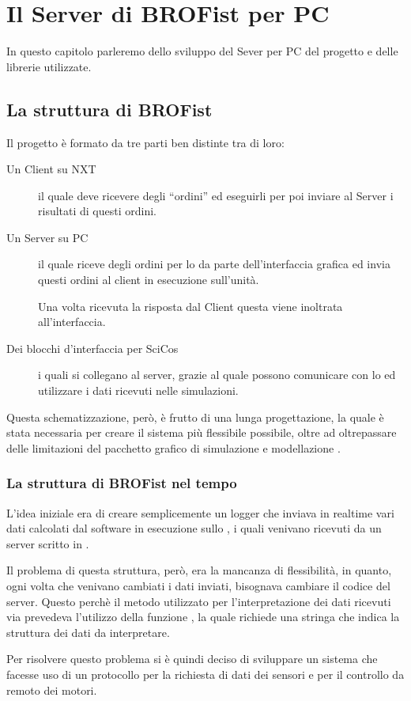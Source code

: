 \chapter{Il Server di BROFist per PC}
\label{chap:PCServ}

In questo capitolo parleremo dello sviluppo del Sever per PC
del progetto \BROFist{} e delle librerie utilizzate.

\section{La struttura di BROFist}
Il progetto \BROFist{} è formato da tre parti ben distinte tra di loro:

\begin{description}
    \item[Un Client su NXT]il quale deve ricevere degli ``ordini'' ed
        eseguirli per poi inviare al Server i risultati di questi ordini.
    \item[Un Server su PC]il quale riceve degli ordini per lo \SPAM{} da
        parte dell'interfaccia grafica ed invia questi ordini al client in
        esecuzione sull'unità.
        
        Una volta ricevuta la risposta dal Client questa viene inoltrata
        all'interfaccia.
    \item[Dei blocchi d'interfaccia per SciCos]i quali si collegano al
        server, grazie al quale possono comunicare con lo \SPAM{} ed
        utilizzare i dati ricevuti nelle simulazioni.
\end{description}

Questa schematizzazione, però, è frutto di una lunga progettazione, la
quale è stata necessaria per creare il sistema più flessibile possibile,
oltre ad oltrepassare delle limitazioni del pacchetto grafico di
simulazione e modellazione .

\subsection{La struttura di BROFist nel tempo}
L'idea iniziale era di creare semplicemente un logger che inviava in
realtime vari dati calcolati dal software in esecuzione sullo \SPAM{}, i
quali venivano ricevuti da un server scritto in .

Il problema di questa struttura, però, era la mancanza di flessibilità, in
quanto, ogni volta che venivano cambiati i dati inviati, bisognava cambiare
il codice del server. Questo perchè il metodo utilizzato per
l'interpretazione dei dati ricevuti via  prevedeva
l'utilizzo della funzione , la quale richiede una
stringa che indica la struttura dei dati da interpretare.

Per risolvere questo problema si è quindi deciso di sviluppare un sistema
che facesse uso di un protocollo per la richiesta di dati dei sensori e per
il controllo da remoto dei motori.

\cleardoublepage
